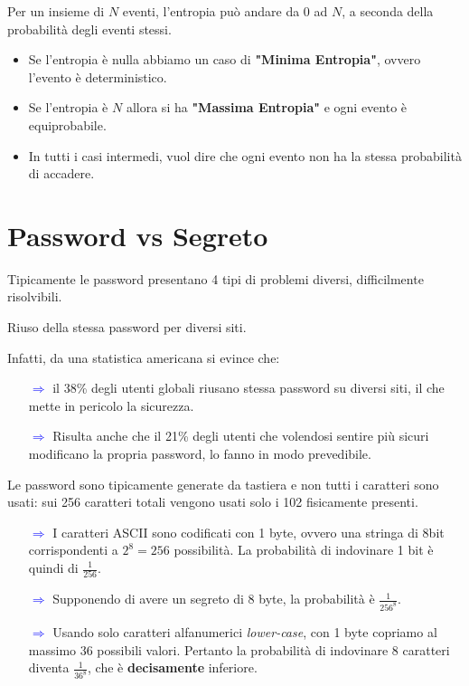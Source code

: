 \begin{remark}
Per un insieme di $N$ eventi, l'entropia può andare da 0 ad $N$, a seconda della probabilità degli eventi stessi. 
\begin{itemize}
    \item Se l'entropia è nulla abbiamo un caso di \textbf{"Minima Entropia"}, ovvero l'evento è deterministico.
    \item Se l'entropia è $N$ allora si ha \textbf{"Massima Entropia"} e ogni evento è equiprobabile.
    \item In tutti i casi intermedi, vuol dire che ogni evento non ha la stessa probabilità di accadere.
\end{itemize} 
\end{remark}
\section{Password vs Segreto}
Tipicamente le password presentano 4 tipi di problemi diversi, difficilmente risolvibili.
\begin{definition}[Overload]
Riuso della stessa password per diversi siti.
\end{definition}
Infatti, da una statistica americana si evince che:
\begin{itemize}
    \item [\textcolor{blue}{$\Rightarrow$}]il 38\% degli utenti globali riusano stessa password su diversi siti, il che mette in pericolo la sicurezza.
    \item [\textcolor{blue}{$\Rightarrow$}]Risulta anche che il 21\% degli utenti che volendosi sentire più sicuri modificano la propria password, lo fanno in modo prevedibile.
\end{itemize}
\begin{definition}
Le password sono tipicamente generate da tastiera e non tutti i caratteri sono usati:  sui 256 caratteri totali vengono usati solo i 102 fisicamente presenti.
\end{definition}
\begin{itemize}
    \item [\textcolor{blue}{$\Rightarrow$}]I caratteri ASCII sono codificati con 1 byte, ovvero una stringa di 8bit corrispondenti a $2^8=256$ possibilità. La probabilità di indovinare 1 bit è quindi di $\frac{1}{256}$. 
    \item [\textcolor{blue}{$\Rightarrow$}]Supponendo di avere un segreto di 8 byte, la probabilità è $\frac{1}{256^8}$.
    \item [\textcolor{blue}{$\Rightarrow$}]Usando solo caratteri alfanumerici \textit{lower-case}, con 1 byte copriamo al massimo 36 possibili valori. Pertanto la probabilità di indovinare 8 caratteri diventa $\frac{1}{36^8}$, che è \textbf{decisamente} inferiore.
\end{itemize}
